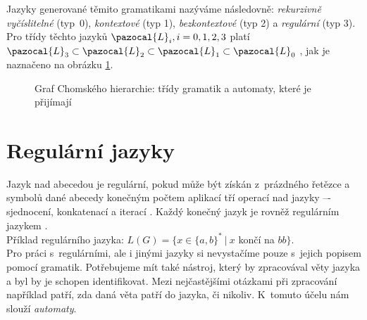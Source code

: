 Jazyky generované těmito gramatikami nazýváme následovně: \textit{rekurzivně vyčíslitelné} \mbox{(typ 0)}, \textit{kontextové}
(typ 1), \textit{bezkontextové} (typ 2) a \textit{regulární} (typ 3). Pro třídy těchto jazyků $\pazocal{L}_i, i = 0, 1, 2, 3$ 
platí $\pazocal{L}_3 \subset \pazocal{L}_2 \subset \pazocal{L}_1 \subset \pazocal{L}_0$ 
\cite[str. 18]{TIN2013}, jak je naznačeno na obrázku \ref{fig:chomsky}. \\

\begin{figure}[h!]
    \label{fig:chomsky}
    \centering
{}
    \caption{Graf Chomského hierarchie: třídy gramatik a automaty, které je přijímají}
\end{figure}
\newpage
\section{Regulární jazyky} \label{sec:2:reg}
Jazyk nad abecedou je regulární, pokud může být získán z~prázdného řetězce a symbolů dané abecedy konečným počtem aplikací tří operací nad 
jazyky –- sjednocení, konkatenací a iterací \cite[str. 29]{Meduna2014}. Každý konečný jazyk je rovněž regulárním jazykem \cite[str. 47]{TIN2013}. \\

\Bat{} Příklad regulárního jazyka: $L(G) = \{x \in \{a, b\}^* \ | \ x$ končí na $ bb\}$. \\

Pro práci s~regulárními, ale i jinými jazyky si nevystačíme pouze s~jejich popisem pomocí gramatik. Potřebujeme mít také nástroj, který by 
zpracovával věty jazyka a byl by je schopen identifikovat. Mezi nejčastějšími otázkami při zpracování například patří, zda daná věta patří 
do jazyka, či nikoliv. K~tomuto účelu nám slouží \textit{automaty}. \\

